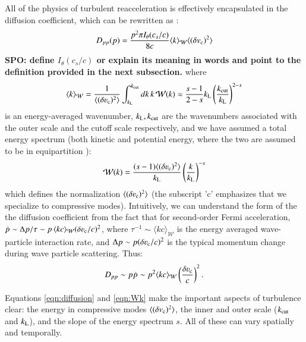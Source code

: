 \documentclass[fleqn,usenatbib,useAMS]{mnras}
\def\SPO#1{{\bf {\color{red} SPO: #1}}}
\begin{document}
All of the physics of turbulent reacceleration is effectively encapsulated in the diffusion coefficient, which can be rewritten as \citep{miniati15}:
\begin{equation}
D_{pp}(p) = \frac{ p^{2} \pi I_{\theta}(c_{s}/c)}{8 c} \langle k \rangle_{\mathcal{W}} \langle (\delta v_{\rm c})^{2} \rangle
\label{eqn:diffusion}
\end{equation}
\SPO{define $I_{\theta}(c_{s}/c)$ or explain its meaning in words and point to the definition provided in the next subsection.}
where
\begin{equation}
\langle k \rangle_{\mathcal{W}} = \frac{1}{\langle (\delta \varv_{\rm c})^{2} \rangle} \int_{k_{\rm L}}^{k_{\rm cut}} dk \, k \, \mathcal{W}(k) \approx \frac{s-1}{2-s} k_{\rm L} \left( \frac{k_{\rm cut}}{k_{\rm L}} \right)^{2-s} 
\end{equation}
is an energy-averaged wavenumber, $k_{\rm L}, k_{\rm cut}$ are the wavenumbers associated with the outer scale and the cutoff scale respectively, and we have assumed a total energy spectrum (both kinetic and potential energy, where the two are assumed to be in equipartition \citep{sarkar11}): 
\begin{equation}
\mathcal{W}(k) = \frac{(s-1) \langle (\delta \varv_{\rm c})^{2} \rangle}{k_{\rm L}} \left( \frac{k}{k_{\rm L}} \right)^{-s} 
\label{eqn:Wk}
\end{equation}
which defines the normalization $\langle (\delta \varv_{\rm c})^{2} \rangle$ (the subscript 'c' emphasizes that we specialize to compressive modes). Intuitively, we can understand the form of the the diffusion coefficient from the fact that for second-order Fermi acceleration, $\dot{p} \sim \Delta p/\tau \sim p\,\langle k c \rangle_{\mathcal{W}} (\delta \varv_{\rm c}/c)^{2}$, where $\tau^{-1} \sim \langle k c \rangle_{\mathcal{W}}$ is the energy averaged wave-particle interaction rate, and $\Delta p \sim p (\delta \varv_{\rm c}/c)^{2}$ is the typical momentum change during wave particle scattering. Thus: 
\begin{equation}
D_{pp} \sim p \dot{p} \sim p^{2} \langle k c \rangle_{\mathcal{W}} \left( \frac{\delta \varv_{\rm c}}{c} \right)^{2}. 
\end{equation}

Equations \ref{eqn:diffusion} and \ref{eqn:Wk} make the important aspects of turbulence clear: the energy in compressive modes $\langle (\delta v_{\rm c})^{2} \rangle$, the inner and outer scale ($k_{\rm cut}$ and $k_{\rm L}$), and the slope of the energy spectrum $s$. All of these can vary spatially and temporally. 
\end{document}

